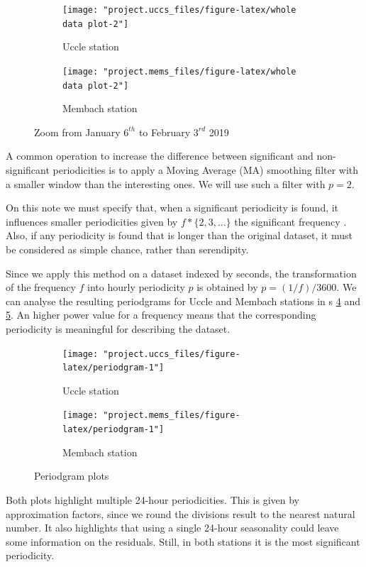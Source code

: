 \documentclass[12pt]{article}
\begin{document}
\begin{figure}[h]
	\begin{subfigure}{.5\linewidth}
		\texttt{[image: "project.uccs\_files/figure-latex/whole data plot-2"]}
		\caption{Uccle station}
		\label{fig:zoom:uccs}
	\end{subfigure}
	\begin{subfigure}{.5\linewidth}
		\texttt{[image: "project.mems\_files/figure-latex/whole data plot-2"]}
		\caption{Membach station}
		\label{fig:zoom:mems}
	\end{subfigure}
	\caption{Zoom from January $6^{th}$ to February $3^{rd}$ 2019}
	\label{fig:zoom}
\end{figure}
%
A common operation to increase the difference between significant and non-significant periodicities is to apply a Moving Average (MA) smoothing filter with a smaller window than the interesting ones. We will use such a filter with $p=2$.

On this note we must specify that, when a significant periodicity is found, it influences smaller periodicities given by $f*\{2,3,\dots\}$ the significant frequency \cite[chapter 11]{brockwell1991time}. Also, if any periodicity is found that is longer than the original dataset, it must be considered as simple chance, rather than serendipity.

Since we apply this method on a dataset indexed by seconds, the transformation of the frequency $f$ into hourly periodicity $p$ is obtained by $p=(1/f)/3600$.
We can analyse the resulting periodgrams for Uccle and Membach stations in \figurename{s} \ref{fig:periodgram:uccs} and \ref{fig:periodgram:mems}.
An higher power value for a frequency means that the corresponding periodicity is meaningful for describing the dataset.

\begin{figure}[h]
	\begin{subfigure}{.5\linewidth}
		\texttt{[image: "project.uccs\_files/figure-latex/periodgram-1"]}
		\caption{Uccle station}
		\label{fig:periodgram:uccs}
	\end{subfigure}
	\begin{subfigure}{.5\linewidth}
		\texttt{[image: "project.mems\_files/figure-latex/periodgram-1"]}
		\caption{Membach station}
		\label{fig:periodgram:mems}
	\end{subfigure}
	\caption{Periodgram plots}
	\label{fig:periodgram}
\end{figure}
%
Both plots highlight multiple 24-hour periodicities. This is given by approximation factors, since we round the divisions result to the nearest natural number. It also highlights that using a single 24-hour seasonality could leave some information on the residuals. Still, in both stations it is the most significant periodicity.
\end{document}

